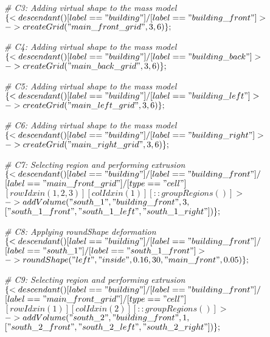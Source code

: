 \noindent \textit{\# C3: Adding virtual shape to the mass model}\\
$\{< descendant() [label=="building"] / [label=="building\_front"] > $\\
$-> createGrid("main\_front\_grid", 3, 6)\};$

\noindent \textit{\# C4: Adding virtual shape to the mass model}\\
$\{< descendant() [label=="building"] / [label=="building\_back"] > $\\
$-> createGrid("main\_back\_grid", 3, 6)\};$

\noindent \textit{\# C5: Adding virtual shape to the mass model}\\
$\{< descendant() [label=="building"] / [label=="building\_left"] > $\\
$-> createGrid("main\_left\_grid", 3, 6)\};$

\noindent \textit{\# C6: Adding virtual shape to the mass model}\\
$\{< descendant() [label=="building"] / [label=="building\_right"] > $\\
$-> createGrid("main\_right\_grid", 3, 6)\};$

\noindent \textit{\# C7: Selecting region and performing extrusion}\\
$\{< descendant() [label=="building"] / [label=="building\_front"] / $\\
$[label=="main\_front\_grid"] / [type=="cell"] $\\
$[rowIdx in (1, 2, 3)] [colIdx in (1)] [::groupRegions()] > $\\
$-> addVolume("south\_1", "building\_front", 3, $\\
$["south\_1\_front", "south\_1\_left", "south\_1\_right"])\};$

\noindent \textit{\# C8: Applying roundShape deformation}\\
$\{< descendant() [label=="building"] / [label=="building\_front"] / $\\
$[label=="south\_1"] / [label=="south\_1\_front"] > $\\
$-> roundShape("left", "inside", 0.16, 30, "main\_front", 0.05)\};$

\noindent \textit{\# C9: Selecting region and performing extrusion}\\
$\{< descendant() [label=="building"] / [label=="building\_front"] / $\\
$[label=="main\_front\_grid"] / [type=="cell"] $\\
$[rowIdx in (1)] [colIdx in (2)] [::groupRegions()] > $\\
$-> addVolume("south\_2", "building\_front", 1, $\\
$["south\_2\_front", "south\_2\_left", "south\_2\_right"])\};$

